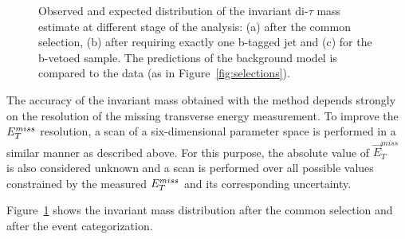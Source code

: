 \begin{figure}[p]
\begin{center}
{            %
     }	

    \end{center}
     	

    \caption{Observed and expected distribution of the 	invariant di-$\tau$ mass estimate \mmc at
	 different stage of the analysis: (a) after the common selection,
	(b) after requiring exactly one b-tagged jet and (c) for the b-vetoed sample.	The predictions 
	of the  background model is compared to  the data (as in Figure~\ref{fig:selections}).}
   \label{fig:mass}
\end{figure}


The accuracy of the  invariant mass obtained with the \mmc method depends strongly on the 
resolution of the missing transverse energy measurement.
To improve the $E_{T}^{miss}$ resolution, a scan of a six-dimensional parameter space is performed 
in a similar manner as described above. For this purpose, the absolute value of $\vec{E}_T^{miss}$ is also considered unknown and a scan 
is performed over all possible values constrained by the measured $E_{T}^{miss}$ and its corresponding uncertainty.
%

Figure~\ref{fig:mass} shows the  \mmc invariant mass distribution after the common selection and after the 
event categorization.

 


